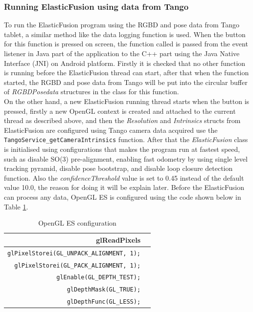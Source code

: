 \documentclass[12pt,twoside]{article}
\begin{document}
\subsubsection{Running ElasticFusion using data from Tango}
To run the ElasticFusion program using the RGBD and pose data from Tango tablet, a similar method like the data logging function is used. When the button for this function is pressed on screen, the function called is passed from the event listener in Java part of the application to the C++ part using the Java Native Interface (JNI) on Android platform. Firstly it is checked that no other function is running before the ElasticFusion thread can start, after that when the function started, the RGBD and pose data from Tango will be put into the circular buffer of \textit{RGBDPosedata} structures in the class for this function.\\
On the other hand, a new ElasticFusion running thread starts when the button is pressed, firstly a new OpenGL context is created and attached to the current thread as described above, and then the \textit{Resolution} and \textit{Intrinsics} structs from ElasticFusion are configured using Tango camera data acquired use the \\
\verb|TangoService_getCameraIntrinsics| function. After that the \textit{ElasticFusion} class is initialised using configurations that makes the program run at fastest speed, such as disable SO(3) pre-alignment, enabling fast odometry by using single level tracking pyramid, disable pose bootstrap, and disable loop closure detection function. Also the \textit{confidenceThreshold} value is set to 0.45 instead of the default value 10.0, the reason for doing it will be explain later. Before the ElasticFusion can process any data, OpenGL ES is configured using the code shown below in Table \ref{table:OpenGL ES configuration}.\\
\begin{table}
\centering
\caption{OpenGL ES configuration}
\label{table:OpenGL ES configuration}
\begin{tabular}{|r|l|}
  \hline
 glReadPixels \\
   \hline
 \verb|glPixelStorei(GL_UNPACK_ALIGNMENT, 1);|\\
   \hline
 \verb|glPixelStorei(GL_PACK_ALIGNMENT, 1);|\\
   \hline
  \verb|glEnable(GL_DEPTH_TEST);|\\
    \hline
  \verb|glDepthMask(GL_TRUE);|\\
    \hline
  \verb|glDepthFunc(GL_LESS);|\\
    \hline
\end{tabular}
\end{table}
\end{document}
